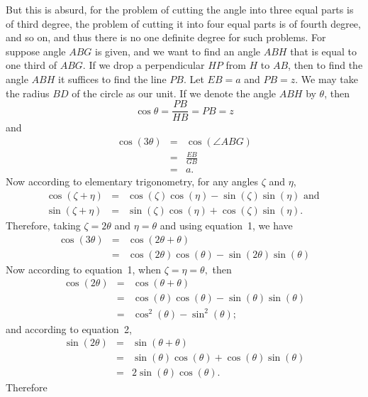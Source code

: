 \documentclass[polutonikogreek,english,twoside,openright]{article}
\newlength{\oldjot}
\begin{document}
But this is absurd, for the problem of cutting the angle into three
equal parts is of third degree, the problem of cutting it into four
equal parts is of fourth degree, and so on, and thus there is no one
definite degree for such problems.  For suppose angle $ABG$ is given,
and we want to find an angle $ABH$ that is equal to one third of
$ABG$.  If we drop a perpendicular $HP$ from $H$ to $AB$, then to find
the angle $ABH$ it suffices to find the line $PB$.  Let $EB =a$ and
$PB =z$.  We may take the radius $BD$ of the circle as our unit.  If
we denote the angle $ABH$ by $\theta$, then
$$\cos \theta = \frac{PB}{HB} = PB = z$$
and 
\setlength{\jot}{1.5ex}
\begin{eqnarray*}
  \cos (3\theta) & = & \cos(\angle ABG)\\
                 & = & \frac{EB}{GB}\\
                 & = & a.
\end{eqnarray*}
\setlength{\jot}{\oldjot}
Now according to elementary trigonometry, for any angles $\zeta$ and $\eta$,
\setcounter{equation}{0}
\begin{eqnarray}
  \cos(\zeta + \eta) & = & \cos(\zeta)\cos(\eta) - \sin(\zeta)\sin(\eta) \mbox{ and }\\
  \sin(\zeta + \eta) & = & \sin(\zeta)\cos(\eta) + \cos(\zeta)\sin(\eta).
\end{eqnarray}
Therefore, taking $\zeta = 2 \theta$ and $\eta = \theta$ and using equation~1, we have
\begin{eqnarray*}
  \cos(3\theta) & = & \cos(2\theta + \theta)\\
                & = & \cos(2\theta)\cos(\theta) - \sin(2\theta)\sin(\theta)
\end{eqnarray*}
Now according to equation~1, when $\zeta = \eta = \theta,$ then
\begin{eqnarray*}
  \cos(2\theta) & = &\cos(\theta + \theta) \\
                & = & \cos(\theta)\cos(\theta) - \sin(\theta)\sin(\theta)\\
                & = & \cos^2(\theta) - \sin^2(\theta);
\end{eqnarray*}
and according to equation~2,
\begin{eqnarray*}
  \sin(2\theta)& = & \sin(\theta +\theta)\\
               & = & \sin(\theta)\cos(\theta) + \cos(\theta)\sin(\theta)\\
               & = & 2\sin(\theta)\cos(\theta).
\end{eqnarray*}
Therefore
\end{document}
